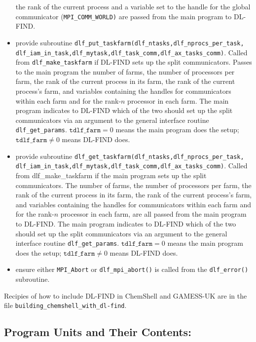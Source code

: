 \documentclass{article}
\begin{document}
\begin{itemize}
      the rank of the current process and a variable set to the handle for the 
      global communicator (\texttt{MPI\_COMM\_WORLD)} are passed from the main program to 
      DL-FIND. 
\item provide subroutine \texttt{dlf\_put\_taskfarm(dlf\_ntasks,dlf\_nprocs\_per\_task, 
      dlf\_iam\_in\_task,dlf\_mytask,dlf\_task\_comm,dlf\_ax\_tasks\_comm)}.
      Called from \texttt{dlf\_make\_taskfarm} if DL-FIND sets up the split communicators.  
      Passes to the main program the number of farms, the number of processors per 
      farm, the rank of 
      the current process in its farm, the rank of the current process's farm, and 
      variables containing the handles for communicators within each farm and for the 
      rank-$n$ processor in each farm.  The main program indicates to DL-FIND which of the 
      two should set up the split communicators via an argument to the general interface routine 
      \texttt{dlf\_get\_params}.  $\texttt{tdlf\_farm}=0$ means the main program does the setup; 
      $\texttt{tdlf\_farm}\neq 0$ means DL-FIND does.
\item provide subroutine \texttt{dlf\_get\_taskfarm(dlf\_ntasks,dlf\_nprocs\_per\_task,
      dlf\_iam\_in\_task,dlf\_mytask,dlf\_task\_comm,dlf\_ax\_tasks\_comm)}.
      Called from dlf\_make\_taskfarm if the main program sets up the split communicators.  
      The number of farms, the number of processors per farm, the rank of 
      the current process in its farm, the rank of the current process's farm, and 
      variables containing the handles for communicators within each farm and for the 
      rank-$n$ processor in each farm, are all passed from the main program to DL-FIND.
      The main program indicates to DL-FIND which of the
      two should set up the split communicators via an argument to the general interface routine
      \texttt{dlf\_get\_params}.  $\texttt{tdlf\_farm}=0$ means the main program does the setup;
      $\texttt{tdlf\_farm}\neq 0$ means DL-FIND does.
\item ensure either \texttt{MPI\_Abort} or \texttt{dlf\_mpi\_abort()} is called from the 
      \texttt{dlf\_error()} subroutine.
\end{itemize} 

Recipies of how to include DL-FIND in ChemShell and GAMESS-UK are in the file
\texttt{building\_chemshell\_with\_dl-find}.

\subsection{Program Units and Their Contents:}
\end{document}
